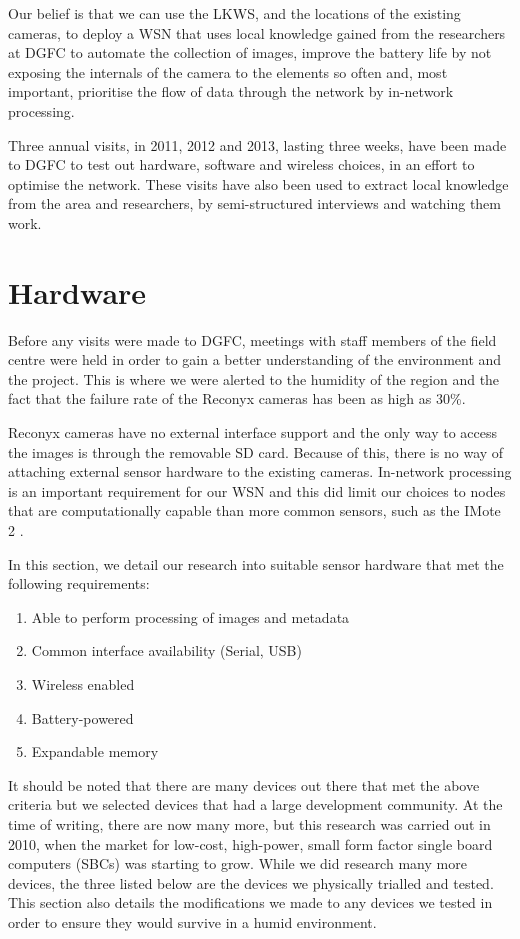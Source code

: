 Our belief is that we can use the LKWS, and the locations of the existing cameras, to deploy a WSN that uses local knowledge gained from the researchers at DGFC to automate the collection of images, improve the battery life by not exposing the internals of the camera to the elements so often and, most important, prioritise the flow of data through the network by in-network processing. 
	
Three annual visits, in 2011, 2012 and 2013, lasting three weeks, have been made to DGFC to test out hardware, software and wireless choices, in an effort to optimise the network. These visits have also been used to extract local knowledge from the area and researchers, by semi-structured interviews and watching them work.

\section{Hardware}\label{tech:hw}
	Before any visits were made to DGFC, meetings with staff members of the field centre were held in order to gain a better understanding of the environment and the project. This is where we were alerted to the humidity of the region and the fact that the failure rate of the Reconyx cameras has been as high as 30\%.

Reconyx cameras have no external interface support and the only way to access the images is through the removable SD card. Because of this, there is no way of attaching external sensor hardware to the existing cameras. In-network processing is an important requirement for our WSN and this did limit our choices to nodes that are computationally capable than more common sensors, such as the IMote 2 \cite{Nachman2008}.

In this section, we detail our research into suitable sensor hardware that met the following requirements:
\begin{enumerate}
	\item Able to perform processing of images and metadata
	\item Common interface availability (Serial, USB)
	\item Wireless enabled
	\item Battery-powered
	\item Expandable memory
\end{enumerate}
It should be noted that there are many devices out there that met the above criteria but we selected devices that had a large development community. At the time of writing, there are now many more, but this research was carried out in 2010, when the market for low-cost, high-power, small form factor single board computers (SBCs) was starting to grow. While we did research many more devices, the three listed below are the devices we physically trialled and tested.
This section also details the modifications we made to any devices we tested in order to ensure they would survive in a humid environment.

